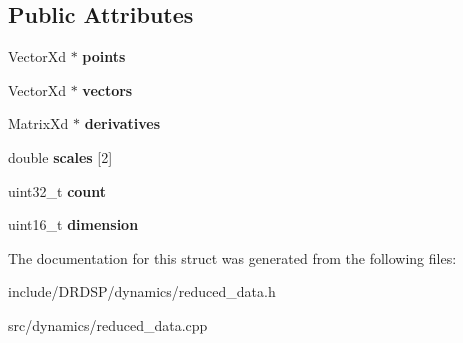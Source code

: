 \subsection*{Public Attributes}
\begin{DoxyCompactItemize}
\item 
\hypertarget{struct_d_r_d_s_p_1_1_reduced_data_a243558842669f45f826d8832931a28da}{Vector\-Xd $\ast$ {\bfseries points}}\label{struct_d_r_d_s_p_1_1_reduced_data_a243558842669f45f826d8832931a28da}

\item 
\hypertarget{struct_d_r_d_s_p_1_1_reduced_data_a07690a84c8d57a4b420e8b889a5d5175}{Vector\-Xd $\ast$ {\bfseries vectors}}\label{struct_d_r_d_s_p_1_1_reduced_data_a07690a84c8d57a4b420e8b889a5d5175}

\item 
\hypertarget{struct_d_r_d_s_p_1_1_reduced_data_a85c036cd52e0d2d6740530f1f4653dff}{Matrix\-Xd $\ast$ {\bfseries derivatives}}\label{struct_d_r_d_s_p_1_1_reduced_data_a85c036cd52e0d2d6740530f1f4653dff}

\item 
\hypertarget{struct_d_r_d_s_p_1_1_reduced_data_ab96e3e52f0f3645ed735c01739b565bb}{double {\bfseries scales} \mbox{[}2\mbox{]}}\label{struct_d_r_d_s_p_1_1_reduced_data_ab96e3e52f0f3645ed735c01739b565bb}

\item 
\hypertarget{struct_d_r_d_s_p_1_1_reduced_data_aed326b4250187f62055aec8fbafc4c45}{uint32\-\_\-t {\bfseries count}}\label{struct_d_r_d_s_p_1_1_reduced_data_aed326b4250187f62055aec8fbafc4c45}

\item 
\hypertarget{struct_d_r_d_s_p_1_1_reduced_data_a15608e335ef89232f565c550262483ba}{uint16\-\_\-t {\bfseries dimension}}\label{struct_d_r_d_s_p_1_1_reduced_data_a15608e335ef89232f565c550262483ba}

\end{DoxyCompactItemize}


The documentation for this struct was generated from the following files\-:\begin{DoxyCompactItemize}
\item 
include/\-D\-R\-D\-S\-P/dynamics/reduced\-\_\-data.\-h\item 
src/dynamics/reduced\-\_\-data.\-cpp\end{DoxyCompactItemize}
